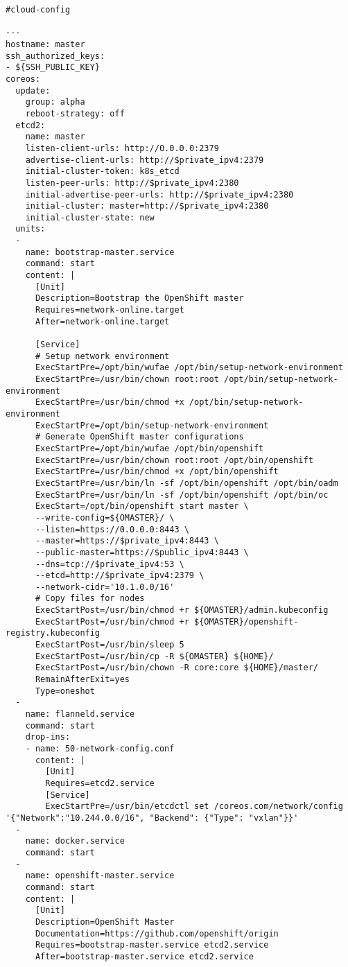 \begin{verbatim}
#cloud-config

---
hostname: master
ssh_authorized_keys:
- ${SSH_PUBLIC_KEY}
coreos:
  update:
    group: alpha
    reboot-strategy: off
  etcd2:
    name: master
    listen-client-urls: http://0.0.0.0:2379
    advertise-client-urls: http://$private_ipv4:2379
    initial-cluster-token: k8s_etcd
    listen-peer-urls: http://$private_ipv4:2380
    initial-advertise-peer-urls: http://$private_ipv4:2380
    initial-cluster: master=http://$private_ipv4:2380
    initial-cluster-state: new
  units:
  -
    name: bootstrap-master.service
    command: start
    content: |
      [Unit]
      Description=Bootstrap the OpenShift master
      Requires=network-online.target
      After=network-online.target

      [Service]
      # Setup network environment
      ExecStartPre=/opt/bin/wufae /opt/bin/setup-network-environment
      ExecStartPre=/usr/bin/chown root:root /opt/bin/setup-network-environment
      ExecStartPre=/usr/bin/chmod +x /opt/bin/setup-network-environment
      ExecStartPre=/opt/bin/setup-network-environment
      # Generate OpenShift master configurations
      ExecStartPre=/opt/bin/wufae /opt/bin/openshift
      ExecStartPre=/usr/bin/chown root:root /opt/bin/openshift
      ExecStartPre=/usr/bin/chmod +x /opt/bin/openshift
      ExecStartPre=/usr/bin/ln -sf /opt/bin/openshift /opt/bin/oadm
      ExecStartPre=/usr/bin/ln -sf /opt/bin/openshift /opt/bin/oc
      ExecStart=/opt/bin/openshift start master \
      --write-config=${OMASTER}/ \
      --listen=https://0.0.0.0:8443 \
      --master=https://$private_ipv4:8443 \
      --public-master=https://$public_ipv4:8443 \
      --dns=tcp://$private_ipv4:53 \
      --etcd=http://$private_ipv4:2379 \
      --network-cidr='10.1.0.0/16'
      # Copy files for nodes
      ExecStartPost=/usr/bin/chmod +r ${OMASTER}/admin.kubeconfig
      ExecStartPost=/usr/bin/chmod +r ${OMASTER}/openshift-registry.kubeconfig
      ExecStartPost=/usr/bin/sleep 5
      ExecStartPost=/usr/bin/cp -R ${OMASTER} ${HOME}/
      ExecStartPost=/usr/bin/chown -R core:core ${HOME}/master/
      RemainAfterExit=yes
      Type=oneshot
  -
    name: flanneld.service
    command: start
    drop-ins:
    - name: 50-network-config.conf
      content: |
        [Unit]
        Requires=etcd2.service
        [Service]
        ExecStartPre=/usr/bin/etcdctl set /coreos.com/network/config '{"Network":"10.244.0.0/16", "Backend": {"Type": "vxlan"}}'
  -
    name: docker.service
    command: start
  -
    name: openshift-master.service
    command: start
    content: |
      [Unit]
      Description=OpenShift Master
      Documentation=https://github.com/openshift/origin
      Requires=bootstrap-master.service etcd2.service
      After=bootstrap-master.service etcd2.service


\end{verbatim}
